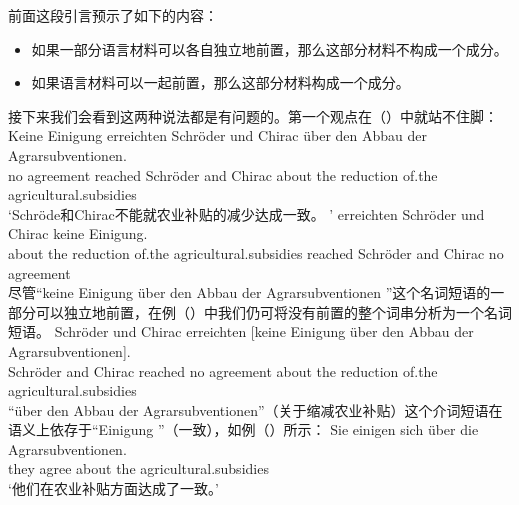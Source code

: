 \noindent
前面这段引言预示了如下的内容：
\begin{itemize}
\item 如果一部分语言材料可以各自独立地前置，那么这部分材料不构成一个成分。
\item 如果语言材料可以一起前置，那么这部分材料构成一个成分。
\end{itemize}
接下来我们会看到这两种说法都是有问题的。第一个观点在（）中就站不住脚：
\eal
\ex
\gll Keine Einigung erreichten Schröder und Chirac über den Abbau der Agrarsubventionen.\footnotemark\\
     no agreement reached Schröder and Chirac about the reduction of.the agricultural.subsidies\\
\glt `Schröde和Chirac不能就农业补贴的减少达成一致。 '
\ex 
{}     erreichten Schröder und Chirac keine Einigung.\\
     \spacebr{}about the reduction of.the agricultural.subsidies reached    Schröder and Chirac no agreement\\
\zl
尽管“keine Einigung über den Abbau der Agrarsubventionen ”这个名词短语的一部分可以独立地前置，在例（）中我们仍可将没有前置的整个词串分析为一个名词短语。
\ea
\gll Schröder und Chirac erreichten [keine Einigung über den Abbau der Agrarsubventionen].\\
     Schröder and Chirac reached    \spacebr{}no agreement about the reduction of.the agricultural.subsidies\\
\z
“über den Abbau der Agrarsubventionen”（关于缩减农业补贴）这个介词短语在语义上依存于“Einigung ”（一致），如例（）所示：
\ea
\gll Sie einigen sich über die Agrarsubventionen.\\
     they agree  about the agricultural.subsidies\\
\glt `他们在农业补贴方面达成了一致。'
\z

